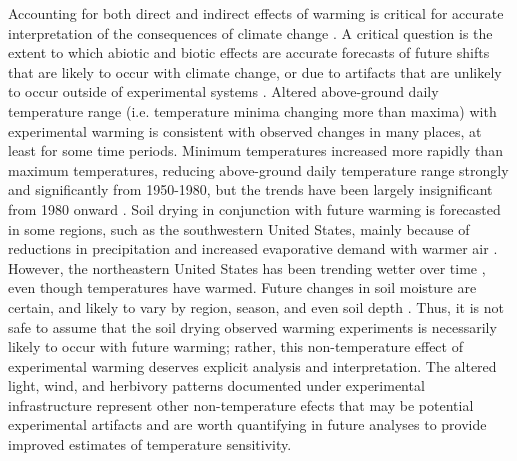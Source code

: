 \documentclass{article}
\begin{document}
\par Accounting for both direct and indirect effects of warming is critical for accurate interpretation of the consequences of climate change \citep{kharouba2015}. %
A critical question is the extent to which abiotic and biotic effects are accurate forecasts of future shifts that are likely to occur with climate change, or due to artifacts that are unlikely to occur outside of experimental systems \citep{moise2010,diamond2013}. Altered above-ground daily temperature range (i.e. temperature minima changing more than maxima) with experimental warming is consistent with observed changes in many places, at least for some time periods. Minimum temperatures increased more rapidly than maximum temperatures, reducing above-ground daily temperature range strongly and significantly from 1950-1980, but the trends have been largely insignificant from 1980 onward \citep{thorne2016,vose2005}. Soil drying in conjunction with future warming is forecasted in some regions, such as the southwestern United States, mainly because of reductions in precipitation and increased evaporative demand with warmer air \citep{dai2013,seager2013}. However, the northeastern United States has been trending wetter over time \citep{shuman2017}, even though temperatures have warmed. Future changes in soil moisture are certain, and likely to vary by region, season, and even soil depth \citep{seager2014,berg2017}. Thus, it is not safe to assume that the soil drying observed warming experiments is necessarily likely to occur with future warming; rather, this non-temperature effect of experimental warming deserves explicit analysis and interpretation. The altered light, wind, and herbivory patterns documented under experimental infrastructure \citep{kennedy1995,moise2010,wolkovich2012,hoeppner2012, clark2014b} represent other non-temperature efects that may be potential experimental artifacts and are worth quantifying in future analyses to provide improved estimates of temperature sensitivity.
\end{document}
